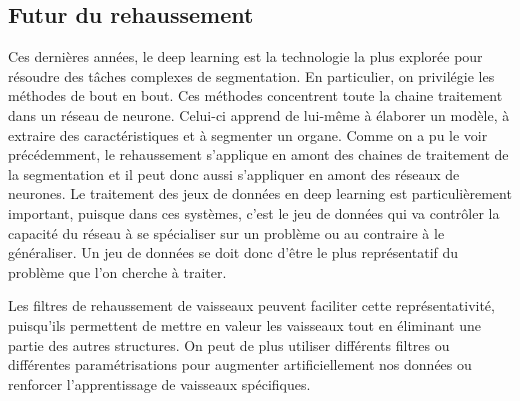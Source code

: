 \subsection{Futur du rehaussement}
Ces dernières années, le deep learning est la technologie la plus explorée pour résoudre des tâches complexes de segmentation. En particulier,  on privilégie les méthodes de bout en bout. Ces méthodes concentrent toute la chaine traitement dans un réseau de neurone. Celui-ci apprend de lui-même à élaborer un modèle, à extraire des caractéristiques et à segmenter un organe. Comme on a pu le voir précédemment, le rehaussement s'applique en amont des chaines de traitement de la segmentation et il peut donc aussi s'appliquer en amont des réseaux de neurones. Le traitement des jeux de données en deep learning est particulièrement important, puisque dans ces systèmes, c'est le jeu de données qui va contrôler la capacité du réseau à se spécialiser sur un problème ou au contraire à le généraliser. Un jeu de données se doit donc d'être le plus représentatif du problème que l'on cherche à traiter.

Les filtres de rehaussement de vaisseaux peuvent faciliter cette représentativité, puisqu'ils permettent de mettre en valeur les vaisseaux tout en éliminant une partie des autres structures. On peut de plus utiliser différents filtres ou différentes paramétrisations pour augmenter artificiellement nos données ou renforcer l'apprentissage de vaisseaux spécifiques.

